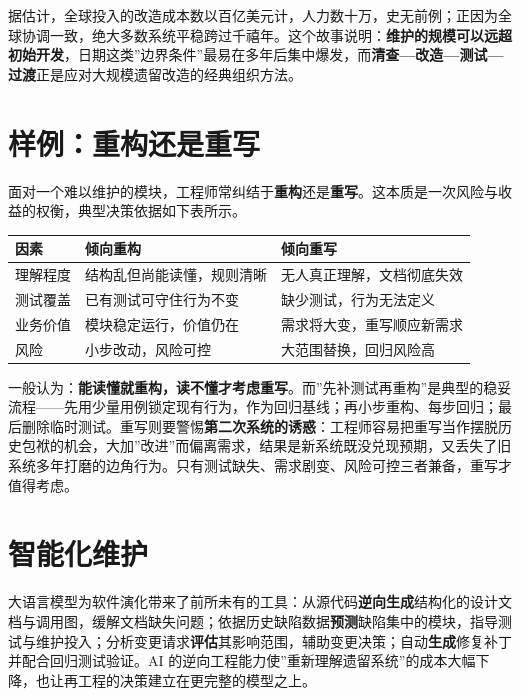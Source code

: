 \documentclass[12pt,a4paper,twoside,openany]{ctexbook}
\numberwithin{figure}{chapter}
\numberwithin{table}{chapter}
\newcounter{none}
\begin{document}
据估计，全球投入的改造成本数以百亿美元计，人力数十万，史无前例；正因为全球协调一致，绝大多数系统平稳跨过千禧年。这个故事说明：\textbf{维护的规模可以远超初始开发}，日期这类''边界条件''最易在多年后集中爆发，而\textbf{清查---改造---测试---过渡}正是应对大规模遗留改造的经典组织方法。

\section{样例：重构还是重写}\label{ux6837ux4f8bux91cdux6784ux8fd8ux662fux91cdux5199}

面对一个难以维护的模块，工程师常纠结于\textbf{重构}还是\textbf{重写}。这本质是一次风险与收益的权衡，典型决策依据如下表所示。

{\def\LTcaptype{none} %
\begin{longtable}[]{@{}lll@{}}
\toprule\noalign{}
因素 & 倾向重构 & 倾向重写 \\
\midrule\noalign{}
\endhead
\bottomrule\noalign{}
\endlastfoot
理解程度 & 结构乱但尚能读懂，规则清晰 & 无人真正理解，文档彻底失效 \\
测试覆盖 & 已有测试可守住行为不变 & 缺少测试，行为无法定义 \\
业务价值 & 模块稳定运行，价值仍在 & 需求将大变，重写顺应新需求 \\
风险 & 小步改动，风险可控 & 大范围替换，回归风险高 \\
\end{longtable}
}

一般认为：\textbf{能读懂就重构，读不懂才考虑重写}。而''先补测试再重构''是典型的稳妥流程------先用少量用例锁定现有行为，作为回归基线；再小步重构、每步回归；最后删除临时测试。重写则要警惕\textbf{第二次系统的诱惑}：工程师容易把重写当作摆脱历史包袱的机会，大加''改进''而偏离需求，结果是新系统既没兑现预期，又丢失了旧系统多年打磨的边角行为。只有测试缺失、需求剧变、风险可控三者兼备，重写才值得考虑。

\section{智能化维护}\label{ux667aux80fdux5316ux7ef4ux62a4}

大语言模型为软件演化带来了前所未有的工具：从源代码\textbf{逆向生成}结构化的设计文档与调用图，缓解文档缺失问题；依据历史缺陷数据\textbf{预测}缺陷集中的模块，指导测试与维护投入；分析变更请求\textbf{评估}其影响范围，辅助变更决策；自动\textbf{生成}修复补丁并配合回归测试验证。AI
的逆向工程能力使''重新理解遗留系统''的成本大幅下降，也让再工程的决策建立在更完整的模型之上。
\end{document}
